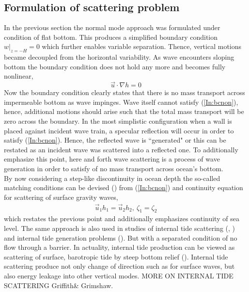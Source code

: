 \subsection{Formulation of scattering problem}
In the previous section the normal mode approach was formulated under condition of flat bottom. This produces a simplified boundary condition $w|_{z = -H} = 0$ which further enables variable separation. Thence, vertical motions became decoupled from the horizontal variability. As wave encounters sloping bottom the boundary condition does not hold any more and becomes fully nonlinear,
\begin{equation}
\vec{u} \cdot \nabla h = 0 \label{In:bcnon}
\end{equation}
Now the boundary condition clearly states that there is no mass transport across impermeable bottom as wave impinges. Wave itself cannot satisfy (\ref{In:bcnon}), hence, additional motions should arise such that the total mass transport will be zero across the boundary. In the most simplistic configuration when a wall is placed against incident wave train, a specular reflection will occur in order to satisfy (\ref{In:bcnon}). Hence, the reflected wave is ``generated" or this can be restated as an incident wave was scattered into a reflected one. To additionally emphasize this point, here and forth wave scattering is a process of wave generation in order to satisfy of no mass transport across ocean's bottom.\\
By now considering a step-like discontinuity in ocean depth the so-called matching conditions can be devised (\cite{mei1989theory}) from (\ref{In:bcnon}) and continuity equation for scattering of surface gravity waves,
\begin{align*}
\vec{u}_1 h_1 = \vec{u}_2 h_2,~\zeta_1 = \zeta_2
\end{align*}
which restates the previous point and additionally emphasizes continuity of sea level. The same approach is also used in studies of internal tide scattering (\cite{larsen1969internal}, \cite{chapman1981scattering}) and internal tide generation problems (\cite{st2002role}). But with a separated condition of no flow through a barrier. In actuality, internal tide production can be viewed as scattering of surface, barotropic tide by steep bottom relief (\cite{hendershott1981long}). Internal tide scattering produce not only change of direction such as for surface waves, but also energy leakage into other vertical modes. MORE ON INTERNAL TIDE SCATTERING Griffith\& Grimshaw.\\
